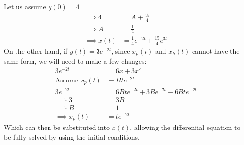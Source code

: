 \documentclass[nobib]{tufte-handout}
\begin{document}
Let us assume $y(0) = 4$
\begin{align*}
    \implies 4    & = A + \frac{15}{4}                      \\
    \implies A    & = \frac{1}{4}                           \\
    \implies x(t) & = \frac{1}{4}e^{-2t}+\frac{15}{4}e^{3t}
\end{align*}
On the other hand, if $y(t) = 3e^{-2t}$, since $x_p(t)$ and $x_h(t)$ cannot have the same form, we will need to make a few changes:
\begin{align*}
    3e^{-2t}              & = 6x+3x'                              \\
    \text{Assume } x_p(t) & = Bte^{-2t}                           \\
    3e^{-2t}              & = 6Bte^{-2t} + 3Be^{-2t} - 6Bte^{-2t} \\
    \implies 3            & = 3B                                  \\
    \implies B            & =1                                    \\
    \implies x_p(t)       & = te^{-2t}
\end{align*}
Which can then be substituted into $x(t)$, allowing the differential equation to be fully solved by using the initial conditions.
\end{document}
